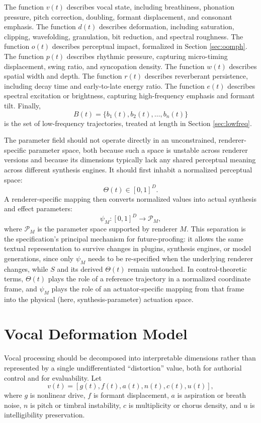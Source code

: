 \documentclass[11pt]{article}
\begin{document}
The function $v(t)$ describes vocal state, including breathiness, phonation pressure, pitch correction, doubling, formant displacement, and consonant emphasis. The function $d(t)$ describes deformation, including saturation, clipping, wavefolding, granulation, bit reduction, and spectral roughness. The function $o(t)$ describes perceptual impact, formalized in Section \ref{sec:oomph}. The function $p(t)$ describes rhythmic pressure, capturing micro-timing displacement, swing ratio, and syncopation density. The function $w(t)$ describes spatial width and depth. The function $r(t)$ describes reverberant persistence, including decay time and early-to-late energy ratio. The function $e(t)$ describes spectral excitation or brightness, capturing high-frequency emphasis and formant tilt. Finally,
\[
B(t)=\{b_1(t),b_2(t),\ldots,b_n(t)\}
\]
is the set of low-frequency trajectories, treated at length in Section \ref{sec:lowfreq}.

The parameter field should not operate directly in an unconstrained, renderer-specific parameter space, both because such a space is unstable across renderer versions and because its dimensions typically lack any shared perceptual meaning across different synthesis engines. It should first inhabit a normalized perceptual space:
\[
\Theta(t)\in[0,1]^D.
\]
A renderer-specific mapping then converts normalized values into actual synthesis and effect parameters:
\[
\psi_M:[0,1]^D\rightarrow\mathcal{P}_M,
\]
where $\mathcal{P}_M$ is the parameter space supported by renderer $M$. This separation is the specification's principal mechanism for future-proofing: it allows the same textual representation to survive changes in plugins, synthesis engines, or model generations, since only $\psi_M$ needs to be re-specified when the underlying renderer changes, while $S$ and its derived $\Theta(t)$ remain untouched. In control-theoretic terms, $\Theta(t)$ plays the role of a reference trajectory in a normalized coordinate frame, and $\psi_M$ plays the role of an actuator-specific mapping from that frame into the physical (here, synthesis-parameter) actuation space.

\section{Vocal Deformation Model}

Vocal processing should be decomposed into interpretable dimensions rather than represented by a single undifferentiated ``distortion'' value, both for authorial control and for evaluability. Let
\[
v(t)=
[
g(t),f(t),a(t),n(t),c(t),u(t)
],
\]
where $g$ is nonlinear drive, $f$ is formant displacement, $a$ is aspiration or breath noise, $n$ is pitch or timbral instability, $c$ is multiplicity or chorus density, and $u$ is intelligibility preservation.
\end{document}
